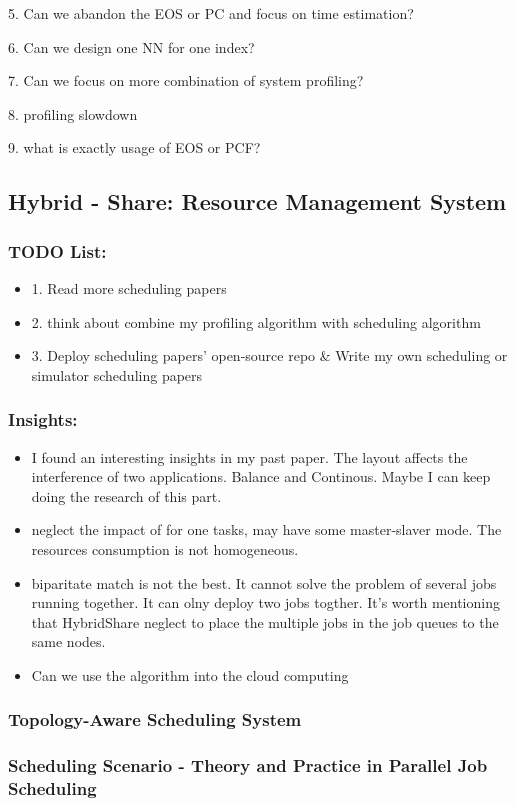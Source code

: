 \documentclass[UTF8]{article}
\begin{document}
5. Can we abandon the EOS or PC and focus on time estimation?

6. Can we design one NN for one index?

7. Can we focus on more combination of system profiling?

8. profiling slowdown

9. what is exactly usage of EOS or PCF?


\subsection{Hybrid - Share: Resource Management System}
\subsubsection{TODO List:}
\begin{itemize}
    \item 1. Read more scheduling papers
    \item 2. think about combine my profiling algorithm with scheduling algorithm
    \item 3. Deploy scheduling papers' open-source repo \& Write my own scheduling or simulator scheduling papers
\end{itemize}
\subsubsection{Insights:}
\begin{itemize}
    \item I found an interesting insights in my past paper. The layout affects the interference of two applications. Balance and Continous. Maybe I can keep doing the research of this part.
    \item neglect the impact of for one tasks, may have some master-slaver mode. The resources consumption is not homogeneous.
    \item biparitate match is not the best. It cannot solve the problem of several jobs running together. It can olny deploy two jobs togther. It's worth mentioning that HybridShare neglect to place the multiple jobs in the job queues to the same nodes.
    \item Can we use the algorithm into the cloud computing
\end{itemize}
\subsubsection{Topology-Aware Scheduling System}
\subsubsection{Scheduling Scenario - Theory and Practice in Parallel Job Scheduling}
\end{document}
